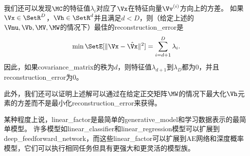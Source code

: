 我们还可以发现$\MC$的特征值$\lambda_i$对应了$\Vx$在特征向量$\Vv^{(i)}$方向上的方差。
如果$\Vx\in \SetR^D$，$\Vh\in\SetR^d$并且满足$d<D$，则（给定上述的${\Vmu},\Vb,\MV,\MW$的情况下）最佳的\gls{reconstruction_error}是
\begin{align}
\label{eqn:1323}
\min \SetE[\Vert \Vx - \hat{\Vx} \Vert^2] = \sum_{i=d+1}^{D}\lambda_i.
\end{align}
因此，如果\gls{covariance_matrix}的秩为$d$，则特征值$\lambda_{d+1}$到$\lambda_{D}$都为$0$，并且\gls{reconstruction_error}为$0$。

此外，我们还可以证明上述解可以通过在给定正交矩阵$\MW$的情况下最大化$\Vh$元素的方差而不是最小化\gls{reconstruction_error}来获得。


某种程度上说，\gls{linear_factor}是最简单的\gls{generative_model}和学习数据表示的最简单模型。
许多模型如\gls{linear_classifier}和\gls{linear_regression}模型可以扩展到\gls{deep_feedforward_network}，而这些\gls{linear_factor}可以扩展到\gls{AE}网络和深度概率模型，它们可以执行相同任务但具有更强大和更灵活的模型族。
